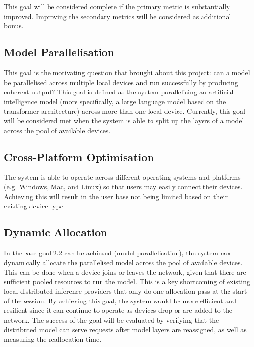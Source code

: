 \documentclass{article}
\begin{document}
\vspace{3mm}

This goal will be considered complete if the primary metric is substantially improved. Improving the
secondary metrics will be considered as additional bonus.

\subsection{Model Parallelisation}
This goal is the motivating question that brought about this project: can a model be parallelised across multiple local devices and run successfully by producing coherent output? This goal is defined as the system parallelising an artificial intelligence model (more specifically, a large language model based on the transformer architecture) across more than one local device. Currently, this goal will be considered met when the system is able to split up the layers of a model across the pool of available devices.
    
\subsection{Cross-Platform Optimisation}
The system is able to operate across different operating systems and platforms (e.g. Windows, Mac, and Linux) so that users may easily connect their devices. Achieving this will result in the user base not being limited based on their existing device type.

\subsection{Dynamic Allocation}
In the case goal 2.2 can be achieved (model parallelisation), the system can dynamically allocate the parallelised model across the pool of available devices. This can be done when a device joins or leaves the network, given that there are sufficient pooled resources to run the model. This is a key shortcoming of existing local distributed inference providers that only do one allocation pass at the start of the session. By achieving this goal, the system would be more efficient and resilient since it can continue to operate as devices drop or are added to the network. The success of the goal will be evaluated by verifying that the distributed model can serve requests after model layers are reassigned, as well as measuring the reallocation time.
\end{document}
